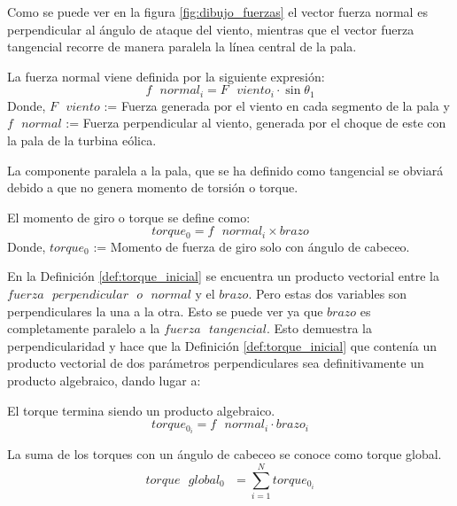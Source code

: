 Como se puede ver en la figura \ref{fig:dibujo_fuerzas} el vector fuerza normal es perpendicular al ángulo de ataque del viento, mientras que el vector fuerza tangencial recorre de manera paralela la línea central de la pala.


 \begin{definicion}
 La fuerza normal viene definida por la siguiente expresión:
  $$ f \text{ } normal_i = F \text{ } viento_i \cdot \sin{\theta_1}$$
Donde,
\centering $F \text{ } viento$ := Fuerza generada por el viento en cada segmento de la pala y $f \text{ } normal$ := Fuerza perpendicular al viento, generada por el choque de este con la pala de la turbina eólica.
 \label{def:fuerza_normal}
 \end{definicion}
 
  La componente paralela a la pala, que se ha definido como tangencial se obviará debido a que no genera momento de torsión o torque. 
  
  \begin{definicion}
El momento de giro o torque se define como:
 $$ torque_0 = f \text{ } normal_i \times brazo$$
Donde,
\centering $torque_0$ := Momento de fuerza de giro solo con ángulo de cabeceo.
  \label{def:torque_inicial}
 \end{definicion}
 

 En la Definición \ref{def:torque_inicial} se encuentra un producto vectorial entre la $fuerza  \text{ }perpendicular \text{ } o \text{ } normal$ y el $brazo$. Pero estas dos variables son perpendiculares la una a la otra. Esto se puede ver ya que $brazo$ es completamente paralelo a la $fuerza \text{ } tangencial$. Esto demuestra la perpendicularidad y hace que la Definición \ref{def:torque_inicial} que contenía un producto vectorial de dos parámetros perpendiculares sea definitivamente un producto algebraico, dando lugar a:
 
 
  \begin{definicion}
  El torque termina siendo un producto algebraico.
 $$ torque_0_{i} = f \text{ } normal_i \cdot brazo_i$$
 \label{def:torque_algebraico_inicial}
 \end{definicion}
 
 
 \begin{definicion}
 La suma de los torques con un ángulo de cabeceo se conoce como torque global.
 $$ torque \text{ } global_0 \text{ } = \sum_{i=1}^{N} torque_0_{i} $$
\label{def:torque_global}
\end{definicion}
 
